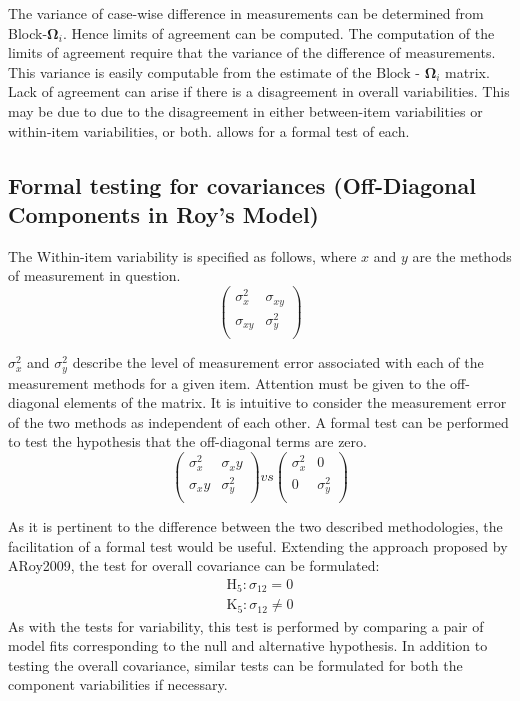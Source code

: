 \documentclass[12pt, a4paper]{report}
\theoremstyle{plain}
\theoremstyle{definition}
\theoremstyle{remark}
\begin{document}
	The variance of case-wise difference in measurements can be determined from Block-$\boldsymbol{\Omega}_{i}$. Hence limits of agreement can be computed. The computation of the limits of agreement require that the variance of the difference of measurements. This variance is easily computable from the estimate of the ${\mbox{Block - }\boldsymbol \Omega_{i}}$ matrix. Lack of agreement can arise if there is a disagreement in overall variabilities. This may be due to due to the disagreement in either between-item
	variabilities or within-item variabilities, or both. \citet{ARoy2009} allows for a formal test of each.

	
	
	
	
	
	
	\subsection{Formal testing for covariances (Off-Diagonal Components in Roy's Model)}
	
	The Within-item variability is specified as follows, where $x$ and $y$ are the methods of measurement in question.
	\[ \left(
	\begin{array}{cc}
	\sigma^2_x & \sigma_{xy} \\
	\sigma_{xy} & \sigma^2_y \\
	\end{array}
	\right)
	\]
	
	$\sigma^2_x$ and $\sigma^2_y$ describe the level of measurement error associated with each of the measurement methods for a given item. Attention must be given to the off-diagonal elements of the matrix. It is intuitive to consider the measurement error of the two methods as independent of each other. A formal test can be performed to test the hypothesis that the off-diagonal terms are zero.
	\[ \left(
	\begin{array}{cc}
	\sigma^2_x & \sigma_xy \\
	\sigma_xy & \sigma^2_y \\
	\end{array}
	\right) vs \left(
	\begin{array}{cc}
	\sigma^2_x & 0 \\
	0 & \sigma^2_y \\
	\end{array}
	\right)
	\]
	
	As it is pertinent to the difference between the two described methodologies, the facilitation of a formal test would be useful. Extending the approach proposed by ARoy2009, the test for overall covariance can be formulated:
	\begin{eqnarray*}
		\operatorname{H_5} : \sigma_{12} = 0 \\
		\operatorname{K_5} : \sigma_{12} \neq 0
	\end{eqnarray*}
	As with the tests for variability, this test is performed by comparing a pair of model fits corresponding to the null and alternative hypothesis. In addition to testing the overall covariance, similar tests can be formulated for both the component variabilities if necessary.
	
\end{document}
